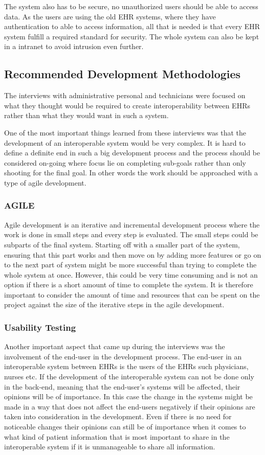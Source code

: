 \documentclass[14pt]{article}
\begin{document}
The system also has to be secure, no unauthorized users should be able to access data. As the users are using the old \gls{EHR} systems, where they have authentication to able to access information, all that is needed is that every \gls{EHR} system fulfill a required standard for security. The whole system can also be kept in a intranet to avoid intrusion even further.

\subsection{Recommended Development Methodologies}
The interviews with administrative personal and technicians were focused on what they thought would be required to create interoperability between \glspl{EHR} rather than what they would want in such a system. 

One of the most important things learned from these interviews was that the development of an interoperable system would be very complex. It is hard to define a definite end in such a big development process and the process should be considered on-going where focus lie on completing sub-goals rather than only shooting for the final goal. In other words the work should be approached with a type of agile development. 

\subsubsection{AGILE}
Agile development is an iterative and incremental development process where the work is done in small steps and every step is evaluated. The small steps could be subparts of the final system. Starting off with a smaller part of the system, ensuring that this part works and then move on by adding more features or go on to the next part of system might be more successful than trying to complete the whole system at once. However, this could be very time consuming and is not an option if there is a short amount of time to complete the system. It is therefore important to consider the amount of time and resources that can be spent on the project against the size of the iterative steps in the agile development.

\subsubsection{Usability Testing}
Another important aspect that came up during the interviews was the involvement of the end-user in the development process. The end-user in an interoperable system between \glspl{EHR} is the users of the \glspl{EHR} such physicians, nurses etc. If the development of the interoperable system can not be done only in the back-end, meaning that the end-user's systems will be affected, their opinions will be of importance. In this case the change in the systems might be made in a way that does not affect the end-users negatively if their opinions are taken into consideration in the development. Even if there is no need for noticeable changes their opinions can still be of importance when it comes to what kind of patient information that is most important to share in the interoperable system if it is unmanageable to share all information. 
\end{document}
